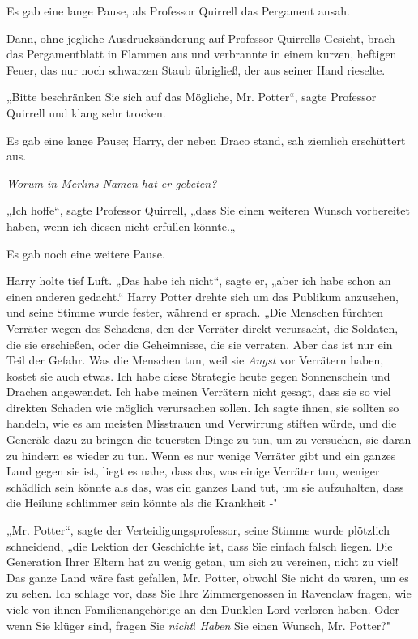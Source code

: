 {Es gab eine lange Pause, als Professor Quirrell das Pergament ansah.

Dann, ohne jegliche Ausdrucksänderung auf Professor Quirrells Gesicht, brach das Pergamentblatt in Flammen aus und verbrannte in einem kurzen, heftigen Feuer, das nur noch schwarzen Staub übrigließ, der aus seiner Hand rieselte.

„Bitte beschränken Sie sich auf das Mögliche, Mr. Potter“, sagte Professor Quirrell und klang sehr trocken.

Es gab eine lange Pause; Harry, der neben Draco stand, sah ziemlich erschüttert aus.

\emph{\emph{Worum in Merlins Namen hat er gebeten?}}

„Ich hoffe“, sagte Professor Quirrell, „dass Sie einen weiteren Wunsch vorbereitet haben, wenn ich diesen nicht erfüllen könnte.„

Es gab noch eine weitere Pause.

Harry holte tief Luft. „Das habe ich nicht“, sagte er, „aber ich habe schon an einen anderen gedacht.“ Harry Potter drehte sich um das Publikum anzusehen, und seine Stimme wurde fester, während er sprach. „Die Menschen fürchten Verräter wegen des Schadens, den der Verräter direkt verursacht, die Soldaten, die sie erschießen, oder die Geheimnisse, die sie verraten. Aber das ist nur ein Teil der Gefahr. Was die Menschen tun, weil sie \emph{Angst} vor Verrätern haben, kostet sie auch etwas. Ich habe diese Strategie heute gegen Sonnenschein und Drachen angewendet. Ich habe meinen Verrätern nicht gesagt, dass sie so viel direkten Schaden wie möglich verursachen sollen. Ich sagte ihnen, sie sollten so handeln, wie es am meisten Misstrauen und Verwirrung stiften würde, und die Generäle dazu zu bringen die teuersten Dinge zu tun, um zu versuchen, sie daran zu hindern es wieder zu tun. Wenn es nur wenige Verräter gibt und ein ganzes Land gegen sie ist, liegt es nahe, dass das, was einige Verräter tun, weniger schädlich sein könnte als das, was ein ganzes Land tut, um sie aufzuhalten, dass die Heilung schlimmer sein könnte als die Krankheit -"

„Mr. Potter“, sagte der Verteidigungsprofessor, seine Stimme wurde plötzlich schneidend, „die Lektion der Geschichte ist, dass Sie einfach falsch liegen. Die Generation Ihrer Eltern hat zu wenig getan, um sich zu vereinen, nicht zu viel! Das ganze Land wäre fast gefallen, Mr. Potter, obwohl Sie nicht da waren, um es zu sehen. Ich schlage vor, dass Sie Ihre Zimmergenossen in Ravenclaw fragen, wie viele von ihnen Familienangehörige an den Dunklen Lord verloren haben. Oder wenn Sie klüger sind, fragen Sie \emph{nicht}! \emph{Haben} Sie einen Wunsch, Mr. Potter?"

}
